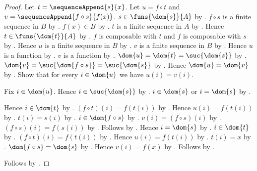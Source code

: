 \begin{proof}
    Let $t=\sequenceAppend{s}{x}$.
    Let $u=f\circ t$ and $v=\sequenceAppend{f\circ s}{f(x)}$.
    $s\in\funs{\dom{s}}{A}$ by .
    $f\circ s$ is a finite sequence in $B$ by
        .
    $f(x)\in B$ by .
    $t$ is a finite sequence in $A$ by
        .
    Hence $t\in\funs{\dom{t}}{A}$ by
        .
    $f$ is composable with $t$ and $f$ is composable with $s$ by
        .
    Hence $u$ is a finite sequence in $B$ by
        .
    $v$ is a finite sequence in $B$ by
        .
    Hence $u$ is a function by
        .
    $v$ is a function by
        .
    $\dom{u}=\dom{t}=\suc{\dom{s}}$ by
        .
    $\dom{v}=\suc{\dom{f\circ s}}=\suc{\dom{s}}$ by
        .
    Hence $\dom{u}=\dom{v}$ by \auto.
    Show that for every $i\in\dom{u}$ we have $u(i)=v(i)$.
    \begin{subproof}
        Fix $i\in\dom{u}$.
        Hence $i\in\suc{\dom{s}}$ by \auto.
        $i\in\dom{s}$ or $i=\dom{s}$ by .
        \begin{byCase}
            Hence $i\in\dom{t}$ by
                .
            $(f\circ t)(i)=f(t(i))$ by
                .
            Hence $u(i)=f(t(i))$ by \auto.
            $t(i)=s(i)$ by .
            $i\in\dom{f\circ s}$ by
                .
            $v(i)=(f\circ s)(i)$ by
                .
            $(f\circ s)(i)=f(s(i))$ by
                .
            Follows by \auto.
            Hence $i=\dom{s}$ by \auto.
            $i\in\dom{t}$ by
                .
            $(f\circ t)(i)=f(t(i))$ by
                .
            Hence $u(i)=f(t(i))$ by \auto.
            $t(i)=x$ by .
            $\dom{f\circ s}=\dom{s}$ by
                .
            Hence $v(i)=f(x)$ by
                .
            Follows by \auto.
        \end{byCase}
    \end{subproof}
    Follows by .
\end{proof}

